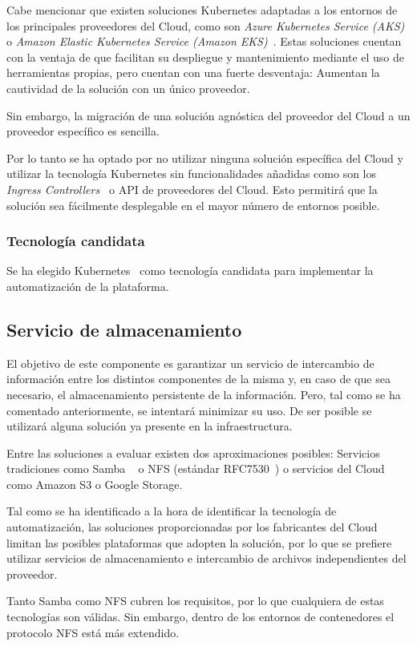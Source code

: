 \par Cabe mencionar que existen soluciones Kubernetes adaptadas a los entornos de los principales proveedores del Cloud, como son {\em Azure Kubernetes Service (AKS)~\cite{aks}} o
{\em Amazon Elastic Kubernetes Service (Amazon EKS)~\cite{eks}}. Estas soluciones cuentan con la ventaja de que facilitan su despliegue y mantenimiento mediante
el uso de herramientas propias, pero cuentan con una fuerte desventaja: Aumentan la cautividad de la solución con un único proveedor.
\par Sin embargo, la migración de una solución agnóstica del proveedor del Cloud a un proveedor específico es sencilla.
\par Por lo tanto se ha optado por no utilizar ninguna solución específica del Cloud y utilizar la tecnología Kubernetes sin funcionalidades añadidas como son
los {\em Ingress Controllers~\cite{ingresscontrollers}} o API de proveedores del Cloud. Esto permitirá que la solución sea fácilmente desplegable en el mayor
número de entornos posible.

\subsubsection{Tecnología candidata}
\par Se ha elegido Kubernetes~\cite{kubernetes} como tecnología candidata para implementar la automatización de la plataforma.

\subsection{Servicio de almacenamiento}
\par El objetivo de este componente es garantizar un servicio de intercambio de información entre los distintos componentes de la misma y, en caso de que sea
necesario, el almacenamiento persistente de la información. Pero, tal como se ha comentado anteriormente, se intentará minimizar su uso. De ser posible se
utilizará alguna solución ya presente en la infraestructura.
\par Entre las soluciones a evaluar existen dos aproximaciones posibles: Servicios tradiciones como Samba ~\cite{samba} o  NFS (estándar RFC7530~\cite{nfs}) o
servicios del Cloud como Amazon S3\cite{s3} o Google Storage\cite{GoogleStorage}.

\par Tal como se ha identificado a la hora de identificar la tecnología de automatización, las soluciones proporcionadas por los fabricantes del Cloud limitan
las posibles plataformas que adopten la solución, por lo que se prefiere utilizar servicios de almacenamiento e intercambio de archivos independientes del
proveedor.
\par Tanto Samba como NFS cubren los requisitos, por lo que cualquiera de estas tecnologías son válidas. Sin embargo, dentro de los entornos de contenedores el
protocolo NFS está más extendido.

